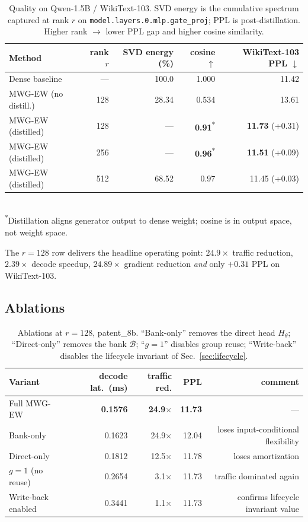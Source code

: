 \documentclass[11pt]{article}
\theoremstyle{definition}
\begin{document}
\begin{table}[h]
\centering
\caption{Quality on Qwen-1.5B / WikiText-103. SVD energy is the cumulative spectrum captured at rank $r$ on \texttt{model.layers.0.mlp.gate\_proj}; PPL is post-distillation. Higher rank $\to$ lower PPL gap and higher cosine similarity.}
\label{tab:quality}
\small
\begin{tabular}{@{}lrrrr@{}}
\toprule
Method & rank $r$ & SVD energy (\%) & cosine $\uparrow$ & WikiText-103 PPL $\downarrow$ \\
\midrule
Dense baseline & --- & 100.0 & 1.000 & 11.42 \\
MWG-EW (no distill.) & 128 & 28.34 & 0.534 & 13.61 \\
\rowcolor{gray!10}
MWG-EW (distilled)   & 128 & --- & \textbf{0.91}\textsuperscript{*} & \textbf{11.73} (+0.31) \\
MWG-EW (distilled)   & 256 & --- & \textbf{0.96}\textsuperscript{*} & \textbf{11.51} (+0.09) \\
MWG-EW (distilled)   & 512 & 68.52 & 0.97 & 11.45 (+0.03) \\
\bottomrule
\end{tabular}
\\[2pt]
{\footnotesize\textsuperscript{*}Distillation aligns generator output to dense weight; cosine is in output space, not weight space.}
\end{table}

The $r{=}128$ row delivers the headline operating point: $24.9\times$ traffic reduction, $2.39\times$ decode speedup, $24.89\times$ gradient reduction \emph{and} only $+0.31$ PPL on WikiText-103.

\subsection{Ablations}

\begin{table}[h]
\centering
\caption{Ablations at $r{=}128$, patent\_8b. ``Bank-only'' removes the direct head $H_\theta$; ``Direct-only'' removes the bank $\mathcal{B}$; ``$g{=}1$'' disables group reuse; ``Write-back'' disables the lifecycle invariant of Sec.~\ref{sec:lifecycle}.}
\label{tab:ablate}
\small
\begin{tabular}{@{}lrrrr@{}}
\toprule
Variant & decode lat.\ (ms) & traffic red. & PPL & comment \\
\midrule
Full MWG-EW          & \textbf{0.1576} & \textbf{24.9$\times$} & \textbf{11.73} & --- \\
Bank-only            & 0.1623 & 24.9$\times$ & 12.04 & loses input-conditional flexibility \\
Direct-only          & 0.1812 & 12.5$\times$ & 11.78 & loses amortization \\
$g{=}1$ (no reuse)   & 0.2654 &  3.1$\times$ & 11.73 & traffic dominated again \\
Write-back enabled   & 0.3441 &  1.1$\times$ & 11.73 & confirms lifecycle invariant value \\
\bottomrule
\end{tabular}
\end{table}
\end{document}
